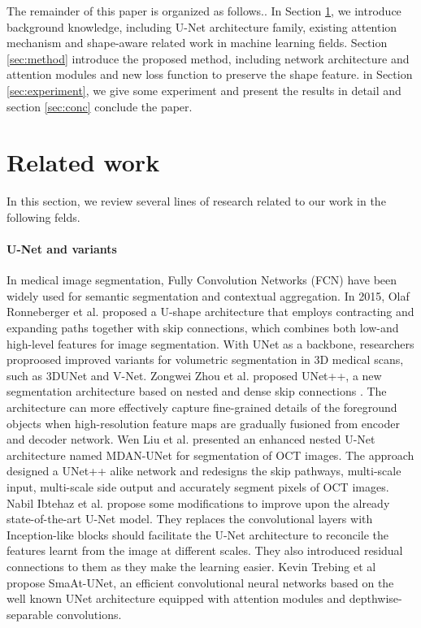 \documentclass[UTF8]{article} %
\begin{document}
The remainder of this paper is organized as follows.. In Section \ref{sec:related}, we introduce background knowledge, including U-Net architecture family, existing attention mechanism and shape-aware related work in machine learning fields. Section \ref{sec:method} introduce the proposed method, including network architecture and attention modules and new loss function to preserve the shape feature. in Section \ref{sec:experiment}, we give some experiment and present the results in detail and section \ref{sec:conc} conclude the paper.

\section{Related work}\label{sec:related}
In this section, we review several lines of research related to our work in the following felds.
\paragraph{U-Net and variants} In medical image segmentation, Fully Convolution Networks (FCN) have been widely used for semantic segmentation and contextual aggregation. In 2015, Olaf Ronneberger et al. proposed a U-shape architecture that employs contracting and expanding paths together with skip connections, which combines both low-and high-level features for image segmentation\cite{RonnebergerFB15}. With UNet as a backbone, researchers proproosed improved variants for volumetric segmentation in 3D medical scans, such as 3DUNet\cite{CicekALBR16} and V-Net\cite{MilletariNA16}. Zongwei Zhou et al. proposed UNet++, a new segmentation architecture based on nested and dense skip connections \cite{ZhouRTL18}. The architecture can more effectively capture fine-grained details of the foreground objects when high-resolution feature maps are gradually fusioned from encoder and decoder network. Wen Liu et al. presented an enhanced nested U-Net architecture named MDAN-UNet for segmentation of OCT images\cite{LiuSJ20}. The approach designed a UNet++ alike network and redesigns the skip pathways, multi-scale input, multi-scale side output and accurately segment pixels of OCT images. Nabil Ibtehaz et al. propose some modifications to improve upon the already state-of-the-art U-Net model\cite{IbtehazR20}. They replaces the convolutional layers with Inception-like blocks should facilitate the U-Net architecture to reconcile the features learnt from the image at different scales. They also introduced residual connections to them as they make the learning easier. Kevin Trebing et al propose SmaAt-UNet, an efficient convolutional neural networks based on the well known UNet architecture equipped with attention modules and depthwise-separable convolutions\cite{TrebinM20}.    
\end{document}
